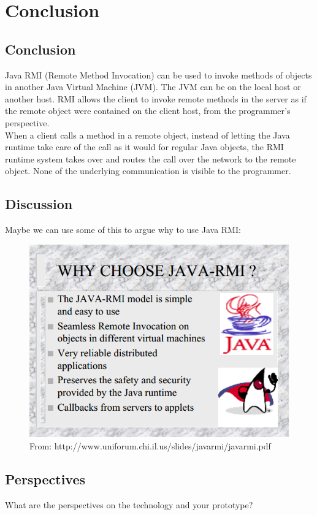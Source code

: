\documentclass[Main]{subfiles}
\begin{document}
\chapter{Conclusion}

\section{Conclusion}
Java RMI (Remote Method Invocation) can be used to invoke methods of
objects in another Java Virtual Machine (JVM). The JVM can be on the
local host or another host. RMI allows the client to invoke remote methods in the server as if the remote object were contained on the client host, from the programmer's perspective.\\When a client calls a method in a remote object, instead of letting the Java runtime take care of the call as it would for regular Java objects, the RMI runtime system takes over and routes the call over the network to the remote object. None of the underlying communication is visible to the programmer.


\section{Discussion}

Maybe we can use some of this to argue why to use Java RMI:
\begin{figure}[H]
\centering
\includegraphics[scale=1]{Figurer/discussion.png}
\caption{From: http://www.uniforum.chi.il.us/slides/javarmi/javarmi.pdf}
\end{figure}


\section{Perspectives}
What are the perspectives on the technology and your prototype? 
\end{document}
